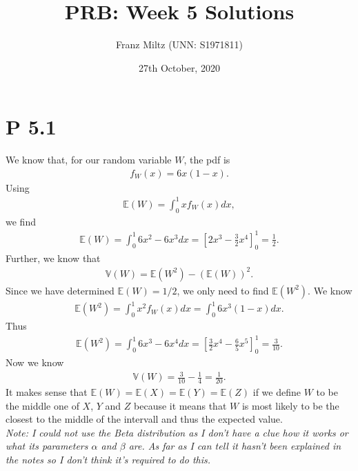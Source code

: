 \documentclass{article}
\newcommand{\E}{\mathbb{E}}
\newcommand{\V}{\mathbb{V}}
\begin{document}
\title{PRB: Week 5 Solutions}
\author{Franz Miltz (UNN: S1971811)}
\date{27th October, 2020}
\maketitle
\section*{P 5.1}
We know that, for our random variable $W$, the pdf is
\begin{align*}
  f_W(x) = 6x(1-x).
\end{align*}
Using
\begin{align*}
  \E(W) = \int_0^1 xf_W(x) dx,
\end{align*}
we find
\begin{align*}
  \E(W)=\int_0^1 6x^2-6x^3 dx = \left[2x^3 - \frac{3}{2}x^4\right]^1_0 = \frac{1}{2}.
\end{align*}
Further, we know that
\begin{align*}
  \V(W) = \E(W^2) - (\E(W))^2.
\end{align*}
Since we have determined $\E(W)=1/2$, we only need to find $\E(W^2)$. We know
\begin{align*}
  \E(W^2) = \int_0^1 x^2 f_{W}(x)dx = \int_0^1 6x^3(1-x)dx.
\end{align*}
Thus
\begin{align*}
  \E(W^2) = \int_0^1 6x^3-6x^4 dx = \left[\frac{3}{2} x^4 - \frac{6}{5}x^5\right]_0^1=\frac{3}{10}.
\end{align*}
Now we know
\begin{align*}
  \V(W) = \frac{3}{10}-\frac{1}{4} = \frac{1}{20}.
\end{align*}
It makes sense that $\E(W) = \E(X) = \E(Y) = \E(Z)$ if we define $W$ to be the middle one of $X$, $Y$ and $Z$ because
it means that $W$ is most likely to be the closest to the middle of the intervall and thus the expected value.\\

\emph{Note: I could not use the Beta distribution as I don't have
a clue how it works or what its parameters $\alpha$ and $\beta$ are.
As far as I can tell it hasn't been explained in the notes so I don't
think it's required to do this.}
\end{document}

